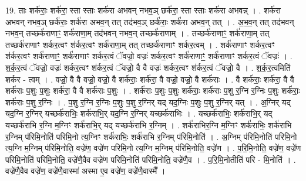 \documentclass[17pt]{extarticle}
\begin{document}
19. ताः शर्क॑राः॒ शर्क॑रा॒ स्ता स्ताः शर्क॑रा अभवन् नभव॒ञ् छर्क॑रा॒ स्ता स्ताः शर्क॑रा अभवन्न् । . शर्क॑रा अभवन् नभव॒ञ् छर्क॑राः॒ शर्क॑रा अभव॒न् तत् तद॑भव॒ञ् छर्क॑राः॒ शर्क॑रा अभव॒न् तत् । . अ॒भ॒व॒न् तत् तद॑भवन् नभव॒न् तच्छर्क॑राणाꣳ॒॒ शर्क॑राणा॒म् तद॑भवन् नभव॒न् तच्छर्क॑राणाम् । . तच्छर्क॑राणाꣳ॒॒ शर्क॑राणा॒म् तत् तच्छर्क॑राणाꣳ शर्कर॒त्वꣳ श॑र्कर॒त्वꣳ शर्क॑राणा॒म् तत् तच्छर्क॑राणाꣳ शर्कर॒त्वम् । . शर्क॑राणाꣳ शर्कर॒त्वꣳ श॑र्कर॒त्वꣳ शर्क॑राणाꣳ॒॒ शर्क॑राणाꣳ शर्कर॒त्वं ॅवज्रो॒ वज्रः॑ शर्कर॒त्वꣳ शर्क॑राणाꣳ॒॒ शर्क॑राणाꣳ शर्कर॒त्वं ॅवज्रः॑ । . श॒र्क॒र॒त्वं ॅवज्रो॒ वज्रः॑ शर्कर॒त्वꣳ श॑र्कर॒त्वं ॅवज्रो॒ वै वै वज्रः॑ शर्कर॒त्वꣳ श॑र्कर॒त्वं ॅवज्रो॒ वै । . श॒र्क॒र॒त्वमिति॑ शर्कर - त्वम् । . वज्रो॒ वै वै वज्रो॒ वज्रो॒ वै शर्क॑राः॒ शर्क॑रा॒ वै वज्रो॒ वज्रो॒ वै शर्क॑राः । . वै शर्क॑राः॒ शर्क॑रा॒ वै वै शर्क॑राः प॒शुः प॒शुः शर्क॑रा॒ वै वै शर्क॑राः प॒शुः । . शर्क॑राः प॒शुः प॒शुः शर्क॑राः॒ शर्क॑राः प॒शु र॒ग्नि र॒ग्निः प॒शुः शर्क॑राः॒ शर्क॑राः प॒शु र॒ग्निः । . प॒शु र॒ग्नि र॒ग्निः प॒शुः प॒शु र॒ग्निर् यद् यद॒ग्निः प॒शुः प॒शु र॒ग्निर् यत् । . अ॒ग्निर् यद् यद॒ग्नि र॒ग्निर् यच्छर्क॑राभिः॒ शर्क॑राभि॒र् यद॒ग्नि र॒ग्निर् यच्छर्क॑राभिः । . यच्छर्क॑राभिः॒ शर्क॑राभि॒र् यद् यच्छर्क॑राभि र॒ग्नि म॒ग्निꣳ शर्क॑राभि॒र् यद् यच्छर्क॑राभि र॒ग्निम् । . शर्क॑राभिर॒ग्नि म॒ग्निꣳ शर्क॑राभिः॒ शर्क॑राभि र॒ग्निम् प॑रिमि॒नोति॑ परिमि॒नो त्य॒ग्निꣳ शर्क॑राभिः॒ शर्क॑राभि र॒ग्निम् प॑रिमि॒नोति॑ । . अ॒ग्निम् प॑रिमि॒नोति॑ परिमि॒नो त्य॒ग्नि म॒ग्निम् प॑रिमि॒नोति॒ वज्रे॑ण॒ वज्रे॑ण परिमि॒नो त्य॒ग्नि म॒ग्निम् प॑रिमि॒नोति॒ वज्रे॑ण । . प॒रि॒मि॒नोति॒ वज्रे॑ण॒ वज्रे॑ण परिमि॒नोति॑ परिमि॒नोति॒ वज्रे॑णै॒वैव वज्रे॑ण परिमि॒नोति॑ परिमि॒नोति॒ वज्रे॑णै॒व । . प॒रि॒मि॒नोतीति॑ परि - मि॒नोति॑ । . वज्रे॑णै॒वैव वज्रे॑ण॒ वज्रे॑णै॒वास्मा॑ अस्मा ए॒व वज्रे॑ण॒ वज्रे॑णै॒वास्मै᳚ । \newline
\end{document}
